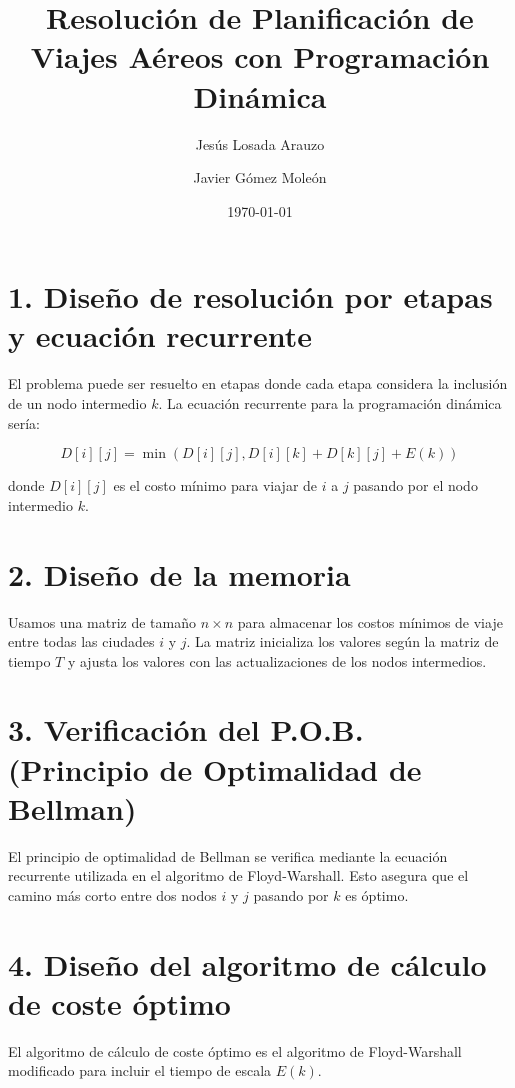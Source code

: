 \documentclass{article}
\begin{document}
\title{Resoluci\'on de Planificaci\'on de Viajes A\'ereos con Programaci\'on Din\'amica}
\author{Jes\'us Losada Arauzo \and Javier G\'omez Mole\'on}
\date{\today}
\maketitle

\section*{1. Dise\~no de resoluci\'on por etapas y ecuaci\'on recurrente}

El problema puede ser resuelto en etapas donde cada etapa considera la inclusi\'on de un nodo intermedio $k$. La ecuaci\'on recurrente para la programaci\'on din\'amica ser\'ia:

\[
D[i][j] = \min(D[i][j], D[i][k] + D[k][j] + E(k))
\]

donde $D[i][j]$ es el costo m\'inimo para viajar de $i$ a $j$ pasando por el nodo intermedio $k$.

\section*{2. Dise\~no de la memoria}

Usamos una matriz de tama\~no $n \times n$ para almacenar los costos m\'inimos de viaje entre todas las ciudades $i$ y $j$. La matriz inicializa los valores seg\'un la matriz de tiempo $T$ y ajusta los valores con las actualizaciones de los nodos intermedios.

\section*{3. Verificaci\'on del P.O.B. (Principio de Optimalidad de Bellman)}

El principio de optimalidad de Bellman se verifica mediante la ecuaci\'on recurrente utilizada en el algoritmo de Floyd-Warshall. Esto asegura que el camino m\'as corto entre dos nodos $i$ y $j$ pasando por $k$ es \'optimo.

\section*{4. Dise\~no del algoritmo de c\'alculo de coste \'optimo}

El algoritmo de c\'alculo de coste \'optimo es el algoritmo de Floyd-Warshall modificado para incluir el tiempo de escala $E(k)$.
\end{document}

